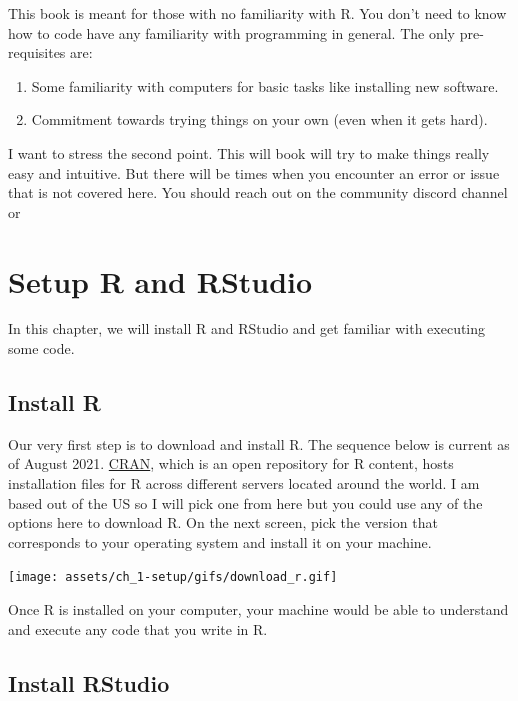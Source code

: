 \documentclass[
]{book}
\providecommand{\tightlist}{%
  \setlength{\itemsep}{0pt}\setlength{\parskip}{0pt}}
\begin{document}
This book is meant for those with no familiarity with R. You don't need to know how to code have any familiarity with programming in general. The only pre-requisites are:

\begin{enumerate}
\def\labelenumi{\arabic{enumi}.}
\tightlist
\item
  Some familiarity with computers for basic tasks like installing new software.
\item
  Commitment towards trying things on your own (even when it gets hard).
\end{enumerate}

I want to stress the second point. This will book will try to make things really easy and intuitive. But there will be times when you encounter an error or issue that is not covered here. You should reach out on the community discord channel or

\hypertarget{setup}{%
\chapter{Setup R and RStudio}\label{setup}}

In this chapter, we will install R and RStudio and get familiar with executing some code.

\hypertarget{install-r}{%
\section{Install R}\label{install-r}}

Our very first step is to download and install R. The sequence below is current as of August 2021. \href{https://cran.r-project.org/}{CRAN}, which is an open repository for R content, hosts installation files for R across different servers located around the world. I am based out of the US so I will pick one from here but you could use any of the options here to download R. On the next screen, pick the version that corresponds to your operating system and install it on your machine.

\texttt{[image: assets/ch\_1-setup/gifs/download\_r.gif]}

Once R is installed on your computer, your machine would be able to understand and execute any code that you write in R.

\hypertarget{install-rstudio}{%
\section{Install RStudio}\label{install-rstudio}}
\end{document}

